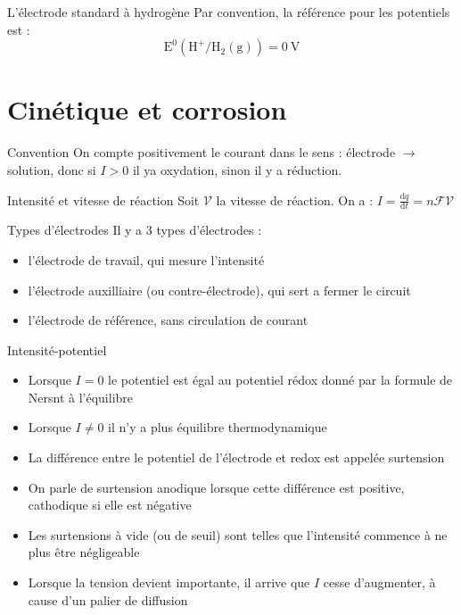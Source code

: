 \documentclass[french, a4paper, 11pt, twocolumn]{article}
\begin{document}
    \begin{cadre}{L'électrode standard à hydrogène}
        Par convention, la référence pour les potentiels est :
        \[\mathrm{E^0(H^+/H_2(g))=\SI{0}{\volt}}\]
    \end{cadre}

    \section{Cinétique et corrosion}
    \begin{cadre}{Convention}
        On compte positivement le courant dans le sens : électrode \(\rightarrow\) solution, donc si \(I>0\) il ya oxydation,
        sinon il y a réduction.
    \end{cadre}

    \begin{cadre}{Intensité et vitesse de réaction}
        Soit \(\mathcal{V}\) la vitesse de réaction.
        On a : \(I=\frac{\mathrm{d}q}{\mathrm{d}t}=n\mathcal{FV}\)
    \end{cadre}

    \begin{cadre}{Types d'électrodes}
        Il y a 3 types d'électrodes :
        \begin{itemize}
            \item l'électrode de travail, qui mesure l'intensité
            \item l'électrode auxilliaire (ou contre-électrode), qui sert a fermer le circuit
            \item l'électrode de référence, sans circulation de courant
        \end{itemize}
    \end{cadre}

    \begin{cadre}{Intensité-potentiel}
        \begin{itemize}
            \item Lorsque \(I=0\) le potentiel est égal au potentiel rédox donné par la formule de Nersnt à l'équilibre
            \item Lorsque \(I\neq 0\) il n'y a plus équilibre thermodynamique
        \end{itemize}
        \begin{itemize}
            \item La différence entre le potentiel de l'électrode et redox est appelée surtension
            \item On parle de surtension anodique lorsque cette différence est positive, cathodique si elle est négative
            \item Les surtensions à vide (ou de seuil) sont telles que l'intensité commence à ne plus être négligeable
        \end{itemize}
        \begin{itemize}
            \item Lorsque la tension devient importante, il arrive que \(I\) cesse d'augmenter, à cause d'un palier de diffusion
        \end{itemize}
    \end{cadre}
\end{document}
